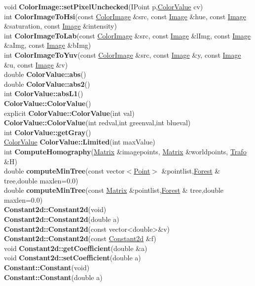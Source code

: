 \documentclass[10pt,titlepage]{article}
\def\functionlistentry#1#2#3#4#5#6{\noindent #1 {\bf #2}(#3) \dotfill #6\\}
\begin{document}
{{\functionlistentry{void}{ColorImage::setPixelUnchecked}{IPoint p,\hyperlink{ColorValue}{ColorValue} cv}{53}{Images}{}
\functionlistentry{int}{ColorImageToHsi}{const \hyperlink{ColorImage}{ColorImage} \&src, const \hyperlink{Image}{Image} \&hue, const \hyperlink{Image}{Image} \&saturation, const \hyperlink{Image}{Image} \&intensity}{1107}{processing}{}
\functionlistentry{int}{ColorImageToLab}{const \hyperlink{ColorImage}{ColorImage} \&src, const \hyperlink{Image}{Image} \&lImg, const \hyperlink{Image}{Image} \&aImg, const \hyperlink{Image}{Image} \&bImg}{1109}{processing}{}
\functionlistentry{int}{ColorImageToYuv}{const \hyperlink{ColorImage}{ColorImage} \&src, const \hyperlink{Image}{Image} \&y, const \hyperlink{Image}{Image} \&u, const \hyperlink{Image}{Image} \&v}{1111}{processing}{}
\functionlistentry{double}{ColorValue::abs}{}{290}{datastructures}{}
\functionlistentry{double}{ColorValue::abs2}{}{291}{datastructures}{}
\functionlistentry{int}{ColorValue::absL1}{}{292}{datastructures}{}
\functionlistentry{}{ColorValue::ColorValue}{}{287}{datastructures}{}
\functionlistentry{explicit}{ColorValue::ColorValue}{int val}{288}{datastructures}{}
\functionlistentry{}{ColorValue::ColorValue}{int redval,int greenval,int blueval}{289}{datastructures}{}
\functionlistentry{int}{ColorValue::getGray}{}{293}{datastructures}{}
\functionlistentry{\hyperlink{ColorValue}{ColorValue}}{ColorValue::Limited}{int maxValue}{294}{datastructures}{}
\functionlistentry{int}{ComputeHomography}{\hyperlink{Matrix}{Matrix} \&imagepoints, \hyperlink{Matrix}{Matrix} \&worldpoints, \hyperlink{Trafo}{Trafo} \&H}{796}{cameraModel}{}
\functionlistentry{double}{computeMinTree}{const vector$<$\hyperlink{Point}{Point}$>$ \&pointlist,\hyperlink{Forest}{Forest} \& tree,double maxlen=0.0}{1295}{graph}{}
\functionlistentry{double}{computeMinTree}{const \hyperlink{Matrix}{Matrix} \&pointlist,\hyperlink{Forest}{Forest} \& tree,double maxlen=0.0}{1296}{graph}{}
\functionlistentry{}{Constant2d::Constant2d}{void}{1032}{functions}{}
\functionlistentry{}{Constant2d::Constant2d}{double a}{1033}{functions}{}
\functionlistentry{}{Constant2d::Constant2d}{const vector\textless {}double\textgreater  \&v}{1034}{functions}{}
\functionlistentry{}{Constant2d::Constant2d}{const \hyperlink{Constant2d}{Constant2d} \&f}{1035}{functions}{}
\functionlistentry{void}{Constant2d::getCoefficient}{double \&a}{1037}{functions}{}
\functionlistentry{void}{Constant2d::setCoefficient}{double a}{1036}{functions}{}
\functionlistentry{}{Constant::Constant}{void}{997}{functions}{}
\functionlistentry{}{Constant::Constant}{double a}{998}{functions}{}
}}
\end{document}
